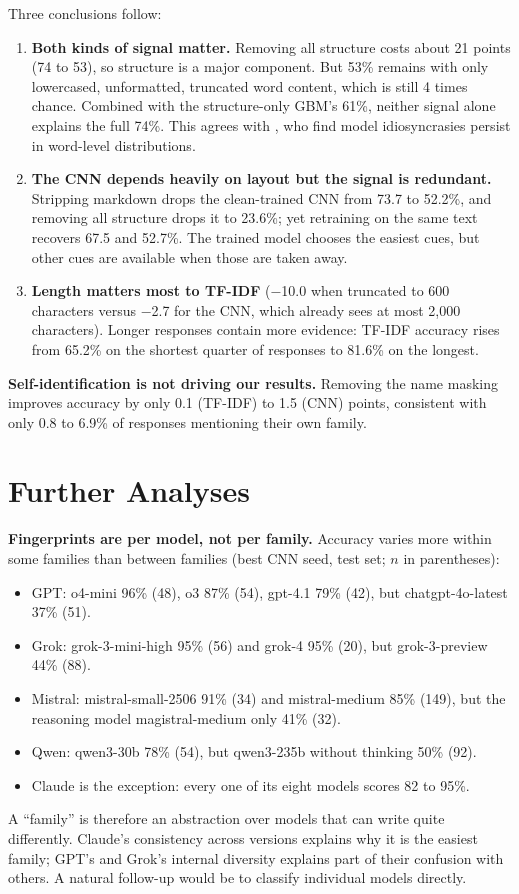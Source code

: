 \documentclass[11pt]{article}
\newcommand{\pct}[1]{#1\%}
\begin{document}
Three conclusions follow:
\begin{enumerate}
  \item \textbf{Both kinds of signal matter.} Removing all structure costs about 21 points (74 to 53), so structure is a major component. But \pct{53} remains with only lowercased, unformatted, truncated word content, which is still 4 times chance. Combined with the structure-only GBM's \pct{61}, neither signal alone explains the full \pct{74}. This agrees with \cite{sun2025idiosyncrasies}, who find model idiosyncrasies persist in word-level distributions.
  \item \textbf{The CNN depends heavily on layout but the signal is redundant.} Stripping markdown drops the clean-trained CNN from 73.7 to \pct{52.2}, and removing all structure drops it to \pct{23.6}; yet retraining on the same text recovers 67.5 and \pct{52.7}. The trained model chooses the easiest cues, but other cues are available when those are taken away.
  \item \textbf{Length matters most to TF-IDF} ($-$10.0 when truncated to 600 characters versus $-$2.7 for the CNN, which already sees at most 2{,}000 characters). Longer responses contain more evidence: TF-IDF accuracy rises from \pct{65.2} on the shortest quarter of responses to \pct{81.6} on the longest.
\end{enumerate}
\textbf{Self-identification is not driving our results.} Removing the name masking improves accuracy by only 0.1 (TF-IDF) to 1.5 (CNN) points, consistent with only 0.8 to \pct{6.9} of responses mentioning their own family.

\section{Further Analyses}
\label{sec:depth}
\textbf{Fingerprints are per model, not per family.} Accuracy varies more within some families than between families (best CNN seed, test set; $n$ in parentheses):
\begin{itemize}
  \item GPT: o4-mini \pct{96} (48), o3 \pct{87} (54), gpt-4.1 \pct{79} (42), but chatgpt-4o-latest \pct{37} (51).
  \item Grok: grok-3-mini-high \pct{95} (56) and grok-4 \pct{95} (20), but grok-3-preview \pct{44} (88).
  \item Mistral: mistral-small-2506 \pct{91} (34) and mistral-medium \pct{85} (149), but the reasoning model magistral-medium only \pct{41} (32).
  \item Qwen: qwen3-30b \pct{78} (54), but qwen3-235b without thinking \pct{50} (92).
  \item Claude is the exception: every one of its eight models scores 82 to \pct{95}.
\end{itemize}
A ``family'' is therefore an abstraction over models that can write quite differently. Claude's consistency across versions explains why it is the easiest family; GPT's and Grok's internal diversity explains part of their confusion with others. A natural follow-up would be to classify individual models directly.
\end{document}
